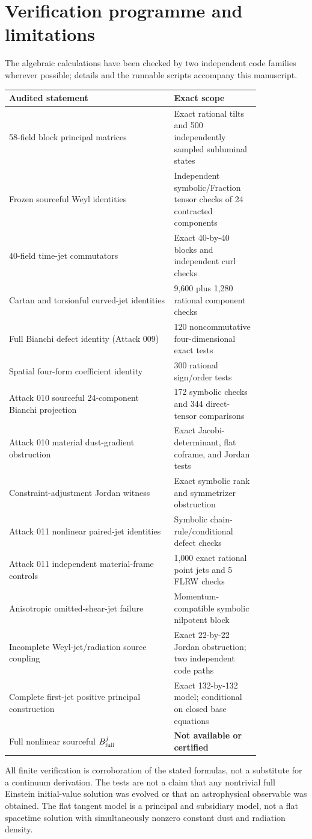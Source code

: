 \documentclass[11pt,a4paper]{article}
\begin{document}
\section{Verification programme and limitations}
The algebraic calculations have been checked by two independent code families wherever possible; details and the runnable scripts accompany this manuscript.
\begin{center}\small\begin{tabular}{p{0.57\linewidth}p{0.26\linewidth}}\toprule
Audited statement & Exact scope\\\midrule
58-field block principal matrices & Exact rational tilts and 500 independently sampled subluminal states\\
Frozen sourceful Weyl identities & Independent symbolic/Fraction tensor checks of 24 contracted components\\
40-field time-jet commutators & Exact 40-by-40 blocks and independent curl checks\\
Cartan and torsionful curved-jet identities & 9,600 plus 1,280 rational component checks\\
Full Bianchi defect identity (Attack 009) & 120 noncommutative four-dimensional exact tests\\
Spatial four-form coefficient identity & 300 rational sign/order tests\\
Attack 010 sourceful 24-component Bianchi projection & 172 symbolic checks and 344 direct-tensor comparisons\\
Attack 010 material dust-gradient obstruction & Exact Jacobi-determinant, flat coframe, and Jordan tests\\
Constraint-adjustment Jordan witness & Exact symbolic rank and symmetrizer obstruction\\
Attack 011 nonlinear paired-jet identities & Symbolic chain-rule/conditional defect checks\\
Attack 011 independent material-frame controls & 1,000 exact rational point jets and 5 FLRW checks\\
Anisotropic omitted-shear-jet failure & Momentum-compatible symbolic nilpotent block\\
Incomplete Weyl-jet/radiation source coupling & Exact 22-by-22 Jordan obstruction; two independent code paths\\
Complete first-jet positive principal construction & Exact 132-by-132 model; conditional on closed base equations\\
Full nonlinear sourceful $B^j_{\rm full}$ & \textbf{Not available or certified}\\\bottomrule\end{tabular}\end{center}
All finite verification is corroboration of the stated formulas, not a substitute for a continuum derivation. The tests are not a claim that any nontrivial full Einstein initial-value solution was evolved or that an astrophysical observable was obtained. The flat tangent model is a principal and subsidiary model, not a flat spacetime solution with simultaneously nonzero constant dust and radiation density.
\end{document}
